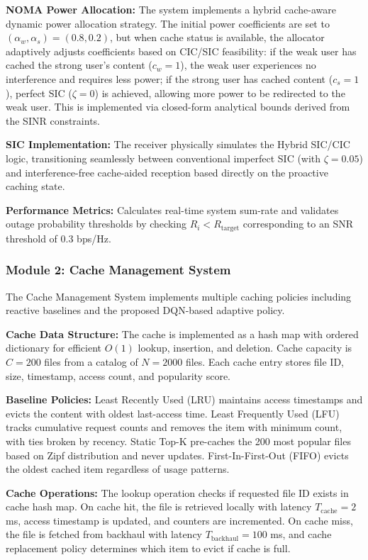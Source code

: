 \documentclass[12pt,a4paper]{article}
\begin{document}
\textbf{NOMA Power Allocation:} The system implements a hybrid cache-aware dynamic power allocation strategy. The initial power coefficients are set to $(\alpha_w, \alpha_s) = (0.8, 0.2)$, but when cache status is available, the allocator adaptively adjusts coefficients based on CIC/SIC feasibility: if the weak user has cached the strong user's content ($c_w = 1$), the weak user experiences no interference and requires less power; if the strong user has cached content ($c_s = 1$), perfect SIC ($\zeta = 0$) is achieved, allowing more power to be redirected to the weak user. This is implemented via closed-form analytical bounds derived from the SINR constraints.

\textbf{SIC Implementation:} The receiver physically simulates the Hybrid SIC/CIC logic, transitioning seamlessly between conventional imperfect SIC (with $\zeta = 0.05$) and interference-free cache-aided reception based directly on the proactive caching state.

\textbf{Performance Metrics:} Calculates real-time system sum-rate and validates outage probability thresholds by checking $R_i < R_{\text{target}}$ corresponding to an SNR threshold of $0.3$ bps/Hz.

\subsubsection{Module 2: Cache Management System}

The Cache Management System implements multiple caching policies including reactive baselines and the proposed DQN-based adaptive policy.

\textbf{Cache Data Structure:} The cache is implemented as a hash map with ordered dictionary for efficient $O(1)$ lookup, insertion, and deletion. Cache capacity is $C = 200$ files from a catalog of $N = 2000$ files. Each cache entry stores file ID, size, timestamp, access count, and popularity score.

\textbf{Baseline Policies:} Least Recently Used (LRU) maintains access timestamps and evicts the content with oldest last-access time. Least Frequently Used (LFU) tracks cumulative request counts and removes the item with minimum count, with ties broken by recency. Static Top-K pre-caches the 200 most popular files based on Zipf distribution and never updates. First-In-First-Out (FIFO) evicts the oldest cached item regardless of usage patterns.

\textbf{Cache Operations:} The lookup operation checks if requested file ID exists in cache hash map. On cache hit, the file is retrieved locally with latency $T_{\text{cache}} = 2$ ms, access timestamp is updated, and counters are incremented. On cache miss, the file is fetched from backhaul with latency $T_{\text{backhaul}} = 100$ ms, and cache replacement policy determines which item to evict if cache is full.
\end{document}
